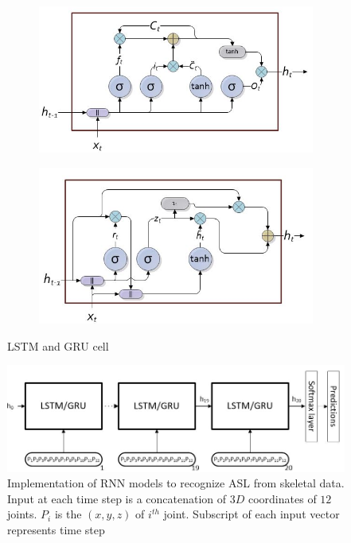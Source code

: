 \documentclass[10pt,twocolumn,letterpaper]{article}
\begin{document}
\begin{figure}[h]
	\begin{center}
		\begin{subfigure}{.45\textwidth}
			\includegraphics[width=\linewidth, height=.2\textheight]{lstm_cell}
			\caption{}
			\label{fig:lstm_cell} 
		\end{subfigure}
		
		\begin{subfigure}{.45\textwidth}
			\includegraphics[width=\linewidth, height=.2\textheight]{gru_cell}
			\caption{}
			\label{fig:gru_cell} 
		\end{subfigure}
	\end{center}
	\caption{LSTM and GRU cell}
	\label{fig:lstm_gru_cells}
\end{figure}
\begin{figure}[h]
	\begin{center}
		\includegraphics[width=.8\linewidth]{rnn_impl}
	\end{center}
	\caption{Implementation of RNN models to recognize ASL from skeletal data. Input at each time step is a concatenation of $3D$ coordinates of $12$ joints. $P_i$ is the $(x, y, z)$ of $i^{th}$ joint. Subscript of each input vector represents time step}
	\label{fig:rnn_impl}
\end{figure}
\end{document}
